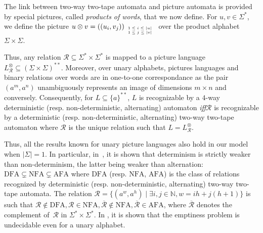 \documentclass[runningheads, envcountsame, a4paper]{llncs}
\newcommand*{\N}{\mathbb{N}}
\newcommand*{\srel}{\mathcal{R}}
\newcommand*{\compl}[1]{\overline{#1}}
\newcommand*{\size}[1]{\left| #1 \right|}
\newcommand*{\ssi}{\emph{iff}\xspace}
\newcommand*{\DFA}{\mathrm{DFA}}
\newcommand*{\NFA}{\mathrm{NFA}}
\newcommand*{\AFA}{\mathrm{AFA}}
\newcommand*{\alphabet}{\Sigma}
\newcommand*{\some}{a}
\newcommand*{\model}{two-way two-tape automaton\xspace}
\renewcommand*{\models}{two-way two-tape automata\xspace}
\newcommand*{\wordsof}[1]{{#1}^*}
\newcommand*{\words}{\wordsof{\alphabet}}
\newcommand*{\picturesof}[1]{{#1}^{**}}
\newcommand*{\upictures}{\picturesof{\{\some\}}}
\newcommand*{\tensorprod}[2]{#1 \otimes #2}
\begin{document}
The link between \models and picture automata is provided by special
pictures, called \emph{products of words}, that we now define. For $u, v
\in \words$, we define the picture $\tensorprod{u}{v} = ((u_i,
v_j))_{\tiny{\begin{array}{l} 1 \leq i \leq \size{u} \\ 1 \leq j \leq
      \size{v} \end{array}}}$ over the product alphabet $\alphabet \times \alphabet$.

Thus, any relation $\srel \subseteq \words \times \words$ is mapped to a
picture language $L_{\srel}^{\otimes} \subseteq \picturesof{(\alphabet
  \times \alphabet)}$.  Moreover, over unary alphabets, pictures languages
and binary relations over words are in one-to-one correspondance as the
pair $(a^m, a^n)$ unambiguously represents an image of dimensions $m \times
n$ and conversely.  Consequently, for $L \subseteq \upictures$,
$L$ is recognizable by a $4$-way deterministic (resp. non-deterministic,
alternating) automaton \ssi $\srel$ is recognizable by a deterministic
(resp. non-deterministic, alternating) \model where $\srel$ is the unique
relation such that $L = L_{\srel}^{\otimes}$.

Thus, all the results known for unary picture languages also hold in our
model when $\size{\alphabet} = 1$. In particular, in~\cite{KariMoore01}, it
is shown that determinism is strictly weaker than non-determinism, the
latter being weaker than alternation: $\DFA \subsetneq \NFA \subsetneq
\AFA$ where $\DFA$ (resp. $\NFA$, $\AFA$) is the class of relations
recognized by deterministic (resp. non-deterministic, alternating) \models.
The relation $\srel = \{(a^w, a^h) \mid \exists i,j \in \N, w = ih +
j(h+1)\}$ is such that $\srel \notin \DFA, \srel \in \NFA, \compl{\srel}
\notin \NFA, \compl{\srel} \in \AFA$, where $\compl{\srel}$ denotes the
complement of~$\srel$ in $ \words \times \words$. In \cite{KariSalo11}, it
is shown that the emptiness problem is undecidable even for a unary
alphabet.
\end{document}

